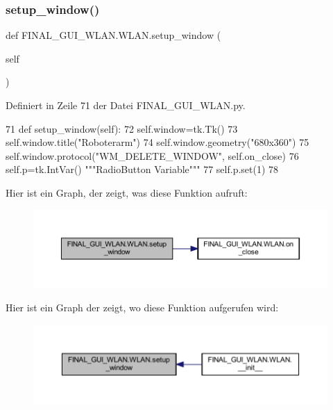 \subsubsection{\texorpdfstring{setup\+\_\+window()}{setup\_window()}}
{\footnotesize\ttfamily def F\+I\+N\+A\+L\+\_\+\+G\+U\+I\+\_\+\+W\+L\+A\+N.\+W\+L\+A\+N.\+setup\+\_\+window (\begin{DoxyParamCaption}\item[{}]{self }\end{DoxyParamCaption})}



Definiert in Zeile 71 der Datei F\+I\+N\+A\+L\+\_\+\+G\+U\+I\+\_\+\+W\+L\+A\+N.\+py.


\begin{DoxyCode}
71     \textcolor{keyword}{def }setup\_window(self):
72         self.window=tk.Tk()
73         self.window.title(\textcolor{stringliteral}{"Roboterarm"})
74         self.window.geometry(\textcolor{stringliteral}{"680x360"})
75         self.window.protocol(\textcolor{stringliteral}{"WM\_DELETE\_WINDOW"}, self.on\_close)
76         self.p=tk.IntVar()                                                      \textcolor{stringliteral}{"""RadioButton Variable"""}
77         self.p.set(1)
78 
\end{DoxyCode}
Hier ist ein Graph, der zeigt, was diese Funktion aufruft\+:\nopagebreak
\begin{figure}[H]
\begin{center}
\leavevmode
\includegraphics[width=350pt]{class_f_i_n_a_l___g_u_i___w_l_a_n_1_1_w_l_a_n_a2253446c57d221d8374f492d3b039edf_cgraph}
\end{center}
\end{figure}
Hier ist ein Graph der zeigt, wo diese Funktion aufgerufen wird\+:\nopagebreak
\begin{figure}[H]
\begin{center}
\leavevmode
\includegraphics[width=350pt]{class_f_i_n_a_l___g_u_i___w_l_a_n_1_1_w_l_a_n_a2253446c57d221d8374f492d3b039edf_icgraph}
\end{center}
\end{figure}


